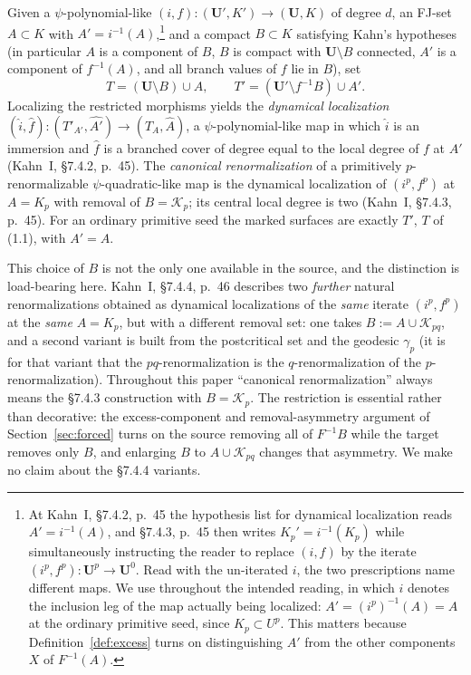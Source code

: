 \begin{definition}\label{def:canonical}
Given a \(\psi\)-polynomial-like \((i,f)\colon(\mathbf U',K')\to(\mathbf U,K)\) of degree \(d\), an FJ-set \(A\subset K\) with \(A'=i^{-1}(A)\),\footnote{At Kahn~I, \S7.4.2, p.~45 the hypothesis list for dynamical localization reads \(A'=i^{-1}(A)\), and \S7.4.3, p.~45 then writes \(K_p'=i^{-1}(K_p)\) while simultaneously instructing the reader to replace \((i,f)\) by the iterate \((i^p,f^p)\colon\mathbf U^p\to\mathbf U^0\).  Read with the un-iterated \(i\), the two prescriptions name different maps.  We use throughout the intended reading, in which \(i\) denotes the inclusion leg of the map actually being localized: \(A'=(i^p)^{-1}(A)=A\) at the ordinary primitive seed, since \(K_p\subset U^p\).  This matters because Definition~\ref{def:excess} turns on distinguishing \(A'\) from the other components \(X\) of \(F^{-1}(A)\).} and a compact \(B\subset K\) satisfying Kahn's hypotheses (in particular \(A\) is a component of \(B\), \(B\) is compact with \(\mathbf U\setminus B\) connected, \(A'\) is a component of \(f^{-1}(A)\), and all branch values of \(f\) lie in \(B\)), set
\[
 T=(\mathbf U\setminus B)\cup A,\qquad T'=(\mathbf U'\setminus f^{-1}B)\cup A'.
\]
Localizing the restricted morphisms yields the \emph{dynamical localization} \((\widehat i,\widehat f)\colon(T'_{A'},\widehat{A'})\to(T_A,\widehat A)\), a \(\psi\)-polynomial-like map in which \(\widehat i\) is an immersion and \(\widehat f\) is a branched cover of degree equal to the local degree of \(f\) at \(A'\) (Kahn~I, \S7.4.2, p.~45).  The \emph{canonical renormalization} of a primitively \(p\)-renormalizable \(\psi\)-quadratic-like map is the dynamical localization of \((i^p,f^p)\) at \(A=K_p\) with removal of \(B=\mathcal K_p\); its central local degree is two (Kahn~I, \S7.4.3, p.~45).  For an ordinary primitive seed the marked surfaces are exactly \(T'\), \(T\) of (1.1), with \(A'=A\).

This choice of \(B\) is not the only one available in the source, and the distinction is load-bearing here.  Kahn~I, \S7.4.4, p.~46 describes two \emph{further} natural renormalizations obtained as dynamical localizations of the \emph{same} iterate \((i^p,f^p)\) at the \emph{same} \(A=K_p\), but with a different removal set: one takes \(B:=A\cup\mathcal K_{pq}\), and a second variant is built from the postcritical set and the geodesic \(\gamma_p\) (it is for that variant that the \(pq\)-renormalization is the \(q\)-renormalization of the \(p\)-renormalization).  Throughout this paper ``canonical renormalization'' always means the \S7.4.3 construction with \(B=\mathcal K_p\).  The restriction is essential rather than decorative: the excess-component and removal-asymmetry argument of Section~\ref{sec:forced} turns on the source removing all of \(F^{-1}B\) while the target removes only \(B\), and enlarging \(B\) to \(A\cup\mathcal K_{pq}\) changes that asymmetry.  We make no claim about the \S7.4.4 variants.
\end{definition}

